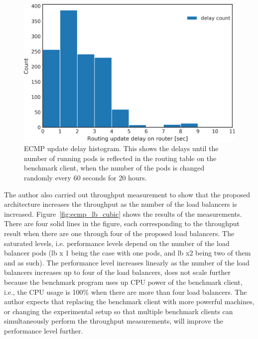 \begin{figure}[h]
  \centering
  \includegraphics[width=0.9\columnwidth]{Figs/ecmp_delay_histgram}
  \par\bigskip
  \centering
  \begin{minipage}{0.9\columnwidth}
    \caption[ECMP update delay histogram]{
      ECMP update delay histogram.
      This shows the delays until the number of running  pods is reflected in the routing table on the benchmark client, when the number of the  pods is changed randomly every 60 seconds for 20 hours.
    }
    \label{fig:ecmp_delay_histgram}
  \end{minipage}
\end{figure}

The author also carried out throughput measurement to show that the proposed architecture increases the throughput as the number of the load balancers is increased.
Figure~\ref{fig:ecmp_lb_cubic} shows the results of the measurements.
There are four solid lines in the figure, each corresponding to the throughput result when there are one through four of the proposed load balancers.
The saturated levels, i.e. performance levels depend on the number of the  load balancer pods (lb x 1 being the case with one  pods, and lb x2 being two of them and as such). 
The performance level increases linearly as the number of the load balancers increases up to four of the  load balancers, 
  does not scale further because the benchmark program uses up CPU power of the benchmark client, i.e., the CPU usage is 100\% when there are more than four load balancers.
The author expects that replacing the benchmark client with more powerful machines, or changing the experimental setup so that multiple benchmark clients can simultaneously perform the throughput measurements, will improve the performance level further.

